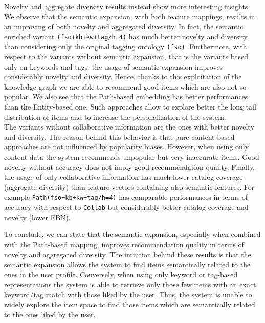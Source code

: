 Novelty and aggregate diversity results instead show more interesting insights. We observe that the semantic expansion, with both feature mappings, results in an improving of both novelty and aggregated diversity. In fact, the semantic enriched variant \texttt{(fso+kb+kw+tag/h=4)} has much better novelty and diversity than considering only the original tagging ontology \texttt{(fso)}. Furthermore, with respect to the variants without semantic expansion, that is the variants based only on keywords and tags, the usage of semantic expansion improves considerably novelty and diversity. Hence, thanks to this exploitation of the knowledge graph we are able to recommend good items which are also not so popular. We also see that the Path-based embedding has better performances than the Entity-based one. 
Such approaches allow to explore better the long tail distribution of items and to increase the personalization of the system. 
\\The variants without collaborative information are the ones with better novelty and diversity. The reason behind this behavior is that pure content-based approaches are not influenced by popularity biases. However, when using only content data the system recommends unpopular but very inaccurate items. Good novelty without accuracy does not imply good recommendation quality. 
Finally, the usage of only collaborative information has much lower catalog coverage (aggregate diversity) than feature vectors containing also semantic features. For example \texttt{Path(fso+kb+kw+tag/h=4)} has comparable performances in terms of accuracy with respect to \texttt{Collab} but considerably better catalog coverage and novelty (lower EBN). 

To conclude, we can state that the semantic expansion, especially when combined with the Path-based mapping, improves recommendation quality in terms of novelty and aggregated diversity. The intuition behind these results is that the semantic expansion allows the system to find items semantically related to the ones in the user profile. Conversely, when using only keyword or tag-based representations the system is able to retrieve only those few items with an exact keyword/tag match with those liked by the user. Thus, the system is unable to widely explore the item space to find those items which are semantically related to the ones liked by the user.
